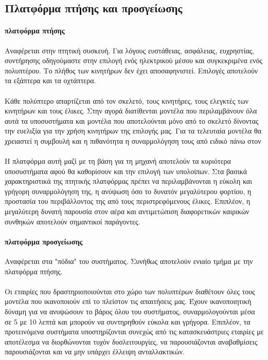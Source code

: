 \documentclass[a4paper, 12pt, twoside]{report}
\begin{document}
{{{{{{		\subsection{Πλατφόρμα πτήσης και προσγείωσης}
			\paragraph{πλατφόρμα πτήσης}{Αναφέρεται στην πτητική συσκευή. Για λόγους ευστάθειας, ασφάλειας, ευχρηστίας, συντήρησης οδηγούμαστε στην επιλογή ενός ηλεκτρικού μέσου και συγκεκριμένα ενός πολυπτέρου. Το πλήθος των κινητήρων δεν έχει αποσαφηνιστεί. Επιλογές αποτελούν τα εξάπτερα και τα οχτάπτερα.
			}
			\paragraph{}{Κάθε πολύπτερο απαρτίζεται από τον σκελετό, τους κινητήρες, τους ελεγκτές των κινητήρων και τους έλικες. Στην αγορά διατίθενται μοντέλα που περιλαμβάνουν όλα αυτά τα υποσυστήματα και μοντέλα που αποτελούνται μόνο από το σκελετό δίνοντας την ευελιξία για την χρήση κινητήρων της επιλογής μας. Για τα τελευταία μοντέλα θα χρειαστεί η συμβουλή και η πιθανότητα η συναρμολόγηση τους από ειδικό πάνω στον
			}
			\paragraph{}{Η πλατφόρμα αυτή μαζί με τη βάση για τη μηχανή αποτελούν τα κυριότερα υποσυστήματα αφού θα καθορίσουν και την επιλογή των υπολοίπων. Στα βασικά χαρακτηριστικά της πτητικής πλατφόρμας πρέπει να περιλαμβάνονται η εύκολη και γρήγορη συναρμολόγηση της, η ανύψωση όσο το δυνατόν μεγαλύτερου φορτίου, η προστασία του περιβάλλοντος της από τους περιστρεφόμενους έλικες. Επιπλέον, η μεγαλύτερη δυνατή παρουσία στον αέρα και αντιμετώπιση διαφορετικών καιρικών συνθηκών αποτελούν σημαντικοί παράγοντες.
			}			
			\paragraph{πλατφόρμα προσγείωσης}{Αναφέρεται στα "πόδια" του συστήματος. Συνήθως αποτελούν ενιαίο τμήμα με την πλατφόρμα πτήσης.
			}
			\paragraph{}{Οι εταιρίες που δραστηριοποιούνται στο χώρο των πολυπτέρων διαθέτουν όλες τους μοντέλα που ικανοποιούν επί το πλείστον τις απαιτήσεις μας. Έχουν ικανοποιητική δύναμη για να ανυψώσουν το βάρος όλου του συστήματος, συναρμολογούνται μέσα σε 5 με 10 λεπτά και μπορούν να συντηρηθούν εύκολα και γρήγορα. Επιπλέον, τα προτεινόμενα συστήματα υποστηρίζονται συνεχώς από τις κατασκευάστριες εταιρίες με αποτέλεσμα να διορθώνονται τυχόν δυσλειτουργίες, να παρουσιάζονται αναβαθμίσεις παρουσιάζονται και να μην υπάρχει έλλειψη ανταλλακτικών.
			}
}}}}}}
\end{document}
